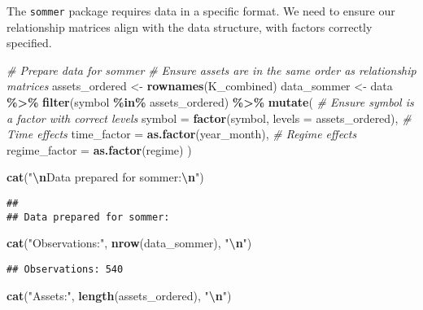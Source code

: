 \documentclass[
]{article}
\newenvironment{Shaded}{\begin{snugshade}}{\end{snugshade}}
\newcommand{\AttributeTok}[1]{\textcolor[rgb]{0.13,0.29,0.53}{#1}}
\newcommand{\CommentTok}[1]{\textcolor[rgb]{0.56,0.35,0.01}{\textit{#1}}}
\newcommand{\FunctionTok}[1]{\textcolor[rgb]{0.13,0.29,0.53}{\textbf{#1}}}
\newcommand{\NormalTok}[1]{#1}
\newcommand{\OtherTok}[1]{\textcolor[rgb]{0.56,0.35,0.01}{#1}}
\newcommand{\SpecialCharTok}[1]{\textcolor[rgb]{0.81,0.36,0.00}{\textbf{#1}}}
\newcommand{\StringTok}[1]{\textcolor[rgb]{0.31,0.60,0.02}{#1}}
\begin{document}
The \texttt{sommer} package requires data in a specific format. We need
to ensure our relationship matrices align with the data structure, with
factors correctly specified.

\begin{Shaded}
\begin{Highlighting}[]
\CommentTok{\# Prepare data for sommer}
\CommentTok{\# Ensure assets are in the same order as relationship matrices}
\NormalTok{assets\_ordered }\OtherTok{\textless{}{-}} \FunctionTok{rownames}\NormalTok{(K\_combined)}
\NormalTok{data\_sommer }\OtherTok{\textless{}{-}}\NormalTok{ data }\SpecialCharTok{\%\textgreater{}\%}
  \FunctionTok{filter}\NormalTok{(symbol }\SpecialCharTok{\%in\%}\NormalTok{ assets\_ordered) }\SpecialCharTok{\%\textgreater{}\%}
  \FunctionTok{mutate}\NormalTok{(}
    \CommentTok{\# Ensure symbol is a factor with correct levels}
    \AttributeTok{symbol =} \FunctionTok{factor}\NormalTok{(symbol, }\AttributeTok{levels =}\NormalTok{ assets\_ordered),}
    \CommentTok{\# Time effects}
    \AttributeTok{time\_factor =} \FunctionTok{as.factor}\NormalTok{(year\_month),}
    \CommentTok{\# Regime effects}
    \AttributeTok{regime\_factor =} \FunctionTok{as.factor}\NormalTok{(regime)}
\NormalTok{  )}

\FunctionTok{cat}\NormalTok{(}\StringTok{"}\SpecialCharTok{\textbackslash{}n}\StringTok{Data prepared for sommer:}\SpecialCharTok{\textbackslash{}n}\StringTok{"}\NormalTok{)}
\end{Highlighting}
\end{Shaded}

\begin{verbatim}
## 
## Data prepared for sommer:
\end{verbatim}

\begin{Shaded}
\begin{Highlighting}[]
\FunctionTok{cat}\NormalTok{(}\StringTok{"Observations:"}\NormalTok{, }\FunctionTok{nrow}\NormalTok{(data\_sommer), }\StringTok{"}\SpecialCharTok{\textbackslash{}n}\StringTok{"}\NormalTok{)}
\end{Highlighting}
\end{Shaded}

\begin{verbatim}
## Observations: 540
\end{verbatim}

\begin{Shaded}
\begin{Highlighting}[]
\FunctionTok{cat}\NormalTok{(}\StringTok{"Assets:"}\NormalTok{, }\FunctionTok{length}\NormalTok{(assets\_ordered), }\StringTok{"}\SpecialCharTok{\textbackslash{}n}\StringTok{"}\NormalTok{)}
\end{Highlighting}
\end{Shaded}
\end{document}
